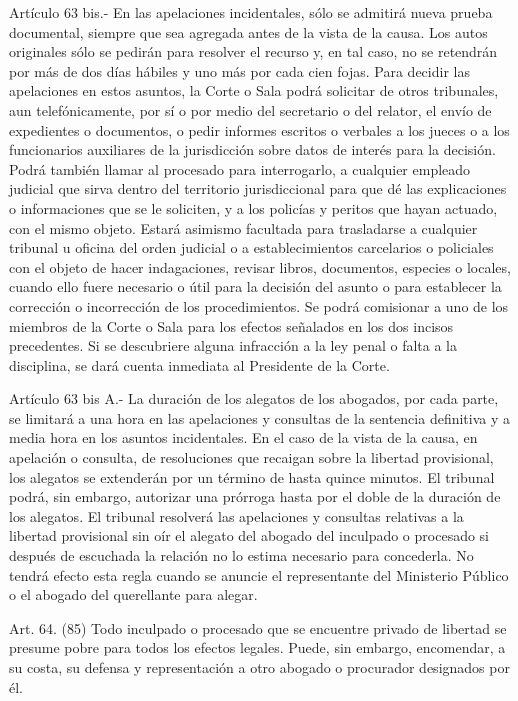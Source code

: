     Artículo 63 bis.- En las apelaciones incidentales, sólo se admitirá nueva prueba documental, siempre que sea agregada antes de la vista de la causa.
    Los autos originales sólo se pedirán para resolver el recurso y, en tal caso, no se retendrán por más de dos días hábiles y uno más por cada cien fojas.
    Para decidir las apelaciones en estos asuntos, la Corte o Sala podrá solicitar de otros tribunales, aun telefónicamente, por sí o por medio del secretario o del relator, el envío de expedientes o documentos, o pedir informes escritos o verbales a los jueces o a los funcionarios auxiliares de la jurisdicción sobre datos de interés para la decisión.
    Podrá también llamar al procesado para interrogarlo, a cualquier empleado judicial que sirva dentro del territorio jurisdiccional para que dé las explicaciones o informaciones que se le soliciten, y a los policías y peritos que hayan actuado, con el mismo objeto.
    Estará asimismo facultada para trasladarse a cualquier tribunal u oficina del orden judicial o a establecimientos carcelarios o policiales con el objeto de hacer indagaciones, revisar libros, documentos, especies o locales, cuando ello fuere necesario o útil para la decisión del asunto o para establecer la corrección o incorrección de los procedimientos.
    Se podrá comisionar a uno de los miembros de la Corte o Sala para los efectos señalados en los dos incisos precedentes.
  Si se descubriere alguna infracción a la ley penal o falta a la disciplina, se dará cuenta inmediata al Presidente de la Corte.



    Artículo 63 bis A.- La duración de los alegatos de los abogados, por cada parte, se limitará a una hora en las apelaciones y consultas de la sentencia definitiva y a media hora en los asuntos incidentales. En el caso de la vista de la causa, en apelación o consulta, de resoluciones que recaigan sobre la libertad provisional, los alegatos se extenderán por un término de hasta quince minutos. El tribunal podrá, sin embargo, autorizar una prórroga hasta por el doble de la duración de los alegatos.
    El tribunal resolverá las apelaciones y consultas relativas a la libertad provisional sin oír el alegato del abogado del inculpado o procesado si después de escuchada la relación no lo estima necesario para concederla. No tendrá efecto esta regla cuando se anuncie el representante del Ministerio Público o el abogado del querellante para alegar.



    Art. 64. (85) Todo inculpado o procesado que se encuentre privado de libertad se presume pobre para todos los efectos legales.
      Puede, sin embargo, encomendar, a su costa, su defensa y representación a otro abogado o procurador designados por él.



